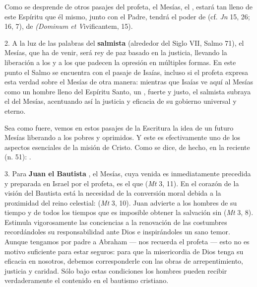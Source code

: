 \begin{body}
\begin{body}
	Como se desprende de otros pasajes del profeta, el Mesías, el , estará tan lleno de este Espíritu que él mismo, junto con el Padre, tendrá el poder de  (cf. \emph{Jn} 15, 26; 16, 7), de  \emph{(Dominum et V}ivificantem, 15).
	
	2. A la luz de las palabras del \textbf{salmista} (alrededor del Siglo VII, Salmo 71), el Mesías, que ha de venir, será rey de paz basado en la justicia, llevando la liberación a los  y a los que padecen la opresión en múltiples formas. En este punto el Salmo se encuentra con el pasaje de Isaías, incluso si el profeta expresa esta verdad sobre el Mesías de otra manera: mientras que Isaías ve aquí al Mesías como un hombre lleno del Espíritu Santo, un , fuerte y justo, el salmista subraya el  del Mesías, acentuando así la justicia y eficacia de su gobierno universal y eterno.
	
	Sea como fuere, vemos en estos pasajes de la Escritura la idea de un futuro Mesías liberando a los pobres y oprimidos. Y este es efectivamente uno de los aspectos esenciales de la misión de Cristo. Como se dice, de hecho, en la reciente  (n. 51): .
	
	3. Para \textbf{Juan el Bautista} , el Mesías, cuya venida es inmediatamente precedida y preparada en Israel por el profeta, es el que  (\emph{Mt} 3, 11). En el corazón de la visión del Bautista está la necesidad de la conversión moral debida a la proximidad del reino celestial:  (\emph{Mt} 3, 10). Juan advierte a los hombres de su tiempo y de todos los tiempos que es imposible obtener la salvación sin  (\emph{Mt} 3, 8). Estimula vigorosamente las conciencias a la renovación de las costumbres recordándoles su responsabilidad ante Dios e inspirándoles un sano temor. Aunque tengamos por padre a Abraham --- nos recuerda el profeta --- esto no es motivo suficiente para estar seguros: para que la misericordia de Dios tenga su eficacia en nosotros, debemos corresponderle con las obras de arrepentimiento, justicia y caridad. Sólo bajo estas condiciones los hombres pueden recibir verdaderamente el  contenido en el bautismo cristiano.
	

\end{body}
\end{body}
